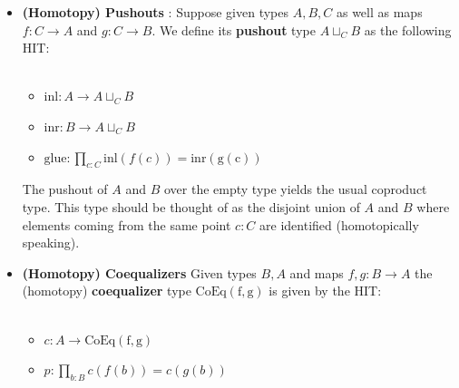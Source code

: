 \documentclass{report}
\begin{document}
\begin{itemize}
  \item \textbf{(Homotopy) Pushouts} : Suppose given types $A,B,C$ as well as maps $f : C \rightarrow A$ and $g : C \rightarrow B$. We define its \textbf{pushout} type $A \sqcup_C B$ as the following HIT:\\\\
    \begin{minipage}{.5\textwidth} 
      \begin{itemize}
        \item $\mathrm{inl} : A \rightarrow A \sqcup_C B$
        \item $\mathrm{inr} : B \rightarrow A \sqcup_C B$
        \item $\mathrm{glue} : \prod_{c : C} \mathrm{inl}(f(c))=\mathrm{inr(g(c))}$
      \end{itemize}
    \end{minipage}
    \hfill 
    \begin{minipage}{.5\textwidth} 
      \begin{center}
        \label{fig:pushoutquare}
      \end{center}
    \end{minipage}
  The pushout of $A$ and $B$ over the empty type yields the usual coproduct type. This type should be thought of as the disjoint union of $A$ and $B$ where elements coming from the same point $c : C$ are identified (homotopically speaking).
  \item \textbf{(Homotopy) Coequalizers} Given types $B,A$ and maps $f,g : B \rightarrow  A$ the (homotopy) \textbf{coequalizer} type $\mathrm{CoEq(f,g)}$ is given by the HIT:\\\\
  \begin{minipage}{.5\textwidth} 
    \begin{itemize}
      \item $c : A \rightarrow \mathrm{CoEq(f,g)}$
      \item $p : \prod_{b : B} c(f(b))=c(g(b))$
    \end{itemize}
  \end{minipage}

\end{itemize}
\end{document}

